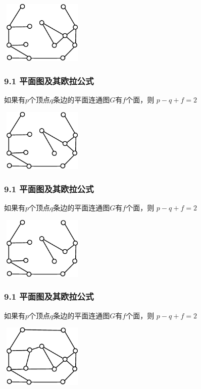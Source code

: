\documentclass{beamer}
\begin{document}
\begin{CJK}{UTF8}{gbsn}
\begin{frame}
\begin{theorem9.1.1}
  \end{theorem9.1.1}
\vspace{1cm}
\centering
    \includegraphics[width=4cm,height=3cm]{euler4}
\end{frame}
\begin{frame}
  \frametitle{9.1 平面图及其欧拉公式}
  \begin{theorem9.1.1}
    如果有$p$个顶点$q$条边的平面连通图$G$有$f$个面，则
      $p - q + f = 2$
  \end{theorem9.1.1}
\vspace{1cm}
\centering
    \includegraphics[width=4cm,height=3cm]{euler5}
\end{frame}

\begin{frame}
  \frametitle{9.1 平面图及其欧拉公式}
  \begin{theorem9.1.1}
    如果有$p$个顶点$q$条边的平面连通图$G$有$f$个面，则
      $p - q + f = 2$
  \end{theorem9.1.1}
\vspace{1cm}
\centering
    \includegraphics[width=4cm,height=3cm]{euler6}
\end{frame}

\begin{frame}
  \frametitle{9.1 平面图及其欧拉公式}
  \begin{theorem9.1.1}
    如果有$p$个顶点$q$条边的平面连通图$G$有$f$个面，则
      $p - q + f = 2$
  \end{theorem9.1.1}
\vspace{1cm}
\centering
    \includegraphics[width=4cm,height=3cm]{euler}
\end{frame}


\end{CJK}
\end{document}

